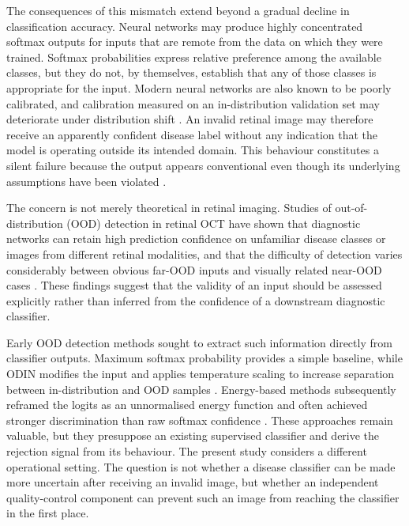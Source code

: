 \documentclass[fleqn,12pt]{olplainarticle}
\begin{document}
The consequences of this mismatch extend beyond a gradual decline in classification accuracy. Neural networks may produce highly concentrated softmax outputs for inputs that are remote from the data on which they were trained. Softmax probabilities express relative preference among the available classes, but they do not, by themselves, establish that any of those classes is appropriate for the input. Modern neural networks are also known to be poorly calibrated, and calibration measured on an in-distribution validation set may deteriorate under distribution shift \cite{guo2017calibration,ovadia2019uncertainty}. An invalid retinal image may therefore receive an apparently confident disease label without any indication that the model is operating outside its intended domain. This behaviour constitutes a silent failure because the output appears conventional even though its underlying assumptions have been violated \cite{hendrycks2017baseline,hein2019relu}.

The concern is not merely theoretical in retinal imaging. Studies of
out-of-distribution (OOD) detection in retinal OCT have shown that diagnostic
networks can retain high prediction confidence on unfamiliar disease classes
or images from different retinal modalities, and that the difficulty of
detection varies considerably between obvious far-OOD inputs and visually
related near-OOD cases \cite{araujo2023fewshot}. These findings suggest that
the validity of an input should be assessed explicitly rather than inferred
from the confidence of a downstream diagnostic classifier.

Early OOD detection methods sought to extract such information directly from classifier outputs. Maximum softmax probability provides a simple baseline, while ODIN modifies the input and applies temperature scaling to increase separation between in-distribution and OOD samples \cite{hendrycks2017baseline,liang2018odin}. Energy-based methods subsequently reframed the logits as an unnormalised energy function and often achieved stronger discrimination than raw softmax confidence \cite{liu2020energy}. These approaches remain valuable, but they presuppose an existing supervised classifier and derive the rejection signal from its behaviour. The present study considers a different operational setting. The question is not whether a disease classifier can be made more uncertain after receiving an invalid image, but whether an independent quality-control component can prevent such an image from reaching the classifier in the first place.
\end{document}
